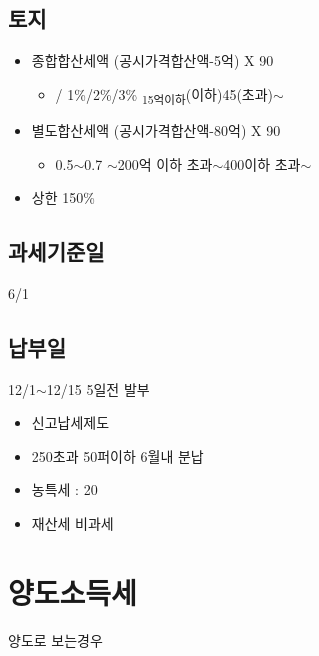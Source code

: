 \documentclass{oblivoir}
\begin{document}
\begin{multicols}{2}
\subsection{토지}\label{uxd1a0uxc9c0}

\begin{itemize}
\itemsep1pt\parskip0pt
\item
  종합합산세액 (공시가격합산액-5억) X 90

  \begin{itemize}
  \itemsep1pt\parskip0pt
  \item
    / 1\%/2\%/3\%
    \textsubscript{15억이하}(이하)45(초과)$\sim$
  \end{itemize}
\item
  별도합산세액 (공시가격합산액-80억) X 90

  \begin{itemize}
  \itemsep1pt\parskip0pt
  \item
    0.5$\sim$0.7 $\sim$200억 이하
    초과$\sim$400이하 초과$\sim$
  \end{itemize}
\item
  상한 150\%
\end{itemize}

\subsection{과세기준일}\label{uxacfcuxc138uxae30uxc900uxc77c}

6/1

\subsection{납부일}\label{uxb0a9uxbd80uxc77c}

12/1$\sim$12/15 5일전 발부

\begin{itemize}
\itemsep1pt\parskip0pt
\item
  신고납세제도
\item
  250초과 50퍼이하 6월내 분납
\item
  농특세 : 20
\item
  재산세 비과세
\end{itemize}

\section{양도소득세}\label{uxc591uxb3c4uxc18cuxb4dduxc138}

양도로 보는경우


\end{multicols}
\end{document}
